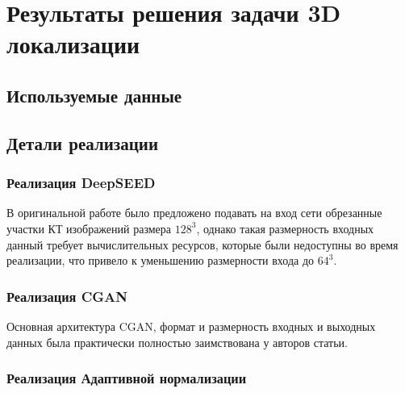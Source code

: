 \chapter{Результаты решения задачи 3D локализации}

\section{Используемые данные}



\section{Детали реализации}

\subsection{Реализация DeepSEED}

В оригинальной работе было предложено подавать на вход сети обрезанные участки КТ изображений размера $128^3$, однако такая размерность входных данный требует вычислительных ресурсов, которые были недоступны во время реализации, что привело к уменьшению размерности входа до $64^3$.

\subsection{Реализация CGAN}

Основная архитектура CGAN, формат и размерность входных и выходных данных была практически полностью заимствована у авторов статьи.

\subsection{Реализация Адаптивной нормализации}